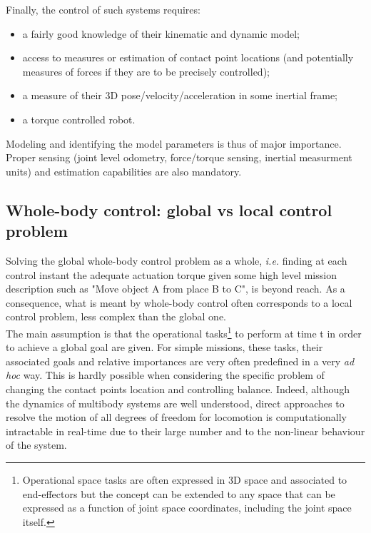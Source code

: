 \documentclass[12pt,a4paper,twoside]{article}
\begin{document}
Finally, the control of such systems requires:
\begin{itemize}
\item a fairly good knowledge of their kinematic and dynamic model;
\item access to measures or estimation of contact point locations (and potentially measures of forces if they are to be precisely controlled);
\item a measure of their 3D pose/velocity/acceleration in some inertial frame;
\item a torque controlled robot.
\end{itemize}
Modeling and identifying the model parameters is thus of major importance. Proper sensing (joint level odometry, force/torque sensing, inertial measurment units) and estimation capabilities are also mandatory.

\subsection{Whole-body control: global vs local control problem} 

Solving the global whole-body control problem as a whole, \textit{i.e.} finding at each control instant the adequate actuation torque given some high level mission description such as "Move object A from place B to C", is beyond reach. As a consequence, what is meant by whole-body control often corresponds to a local control problem, less complex than the global one.\\

The main assumption is that the operational tasks\footnote{Operational space tasks are often expressed in 3D space and associated to end-effectors but the concept can be extended to any space that can be expressed as a function of joint space coordinates, including the joint space itself.} to perform at time t in order to achieve a global goal are given. For simple missions, these tasks, their associated goals and relative importances are very often predefined in a very \textit{ad hoc} way. This is hardly possible when considering the specific problem of changing the contact points location and controlling balance. Indeed, although the dynamics of multibody systems are well understood, direct approaches to resolve the motion of all degrees of freedom for locomotion is computationally intractable in real-time due to their large number and to the non-linear behaviour of the system.\\
\end{document}
